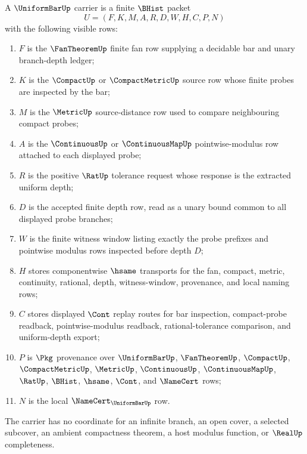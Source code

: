 \begin{definition}
\label{def:uniform-bar-carrier}
A $\UniformBarUp$ carrier is a finite $\BHist$ packet
$$
U=(F,K,M,A,R,D,W,H,C,P,N)
$$
with the following visible rows:
\begin{enumerate}
\item $F$ is the $\FanTheoremUp$ finite fan row supplying a decidable bar and unary branch-depth ledger;
\item $K$ is the $\CompactUp$ or $\CompactMetricUp$ source row whose finite probes are inspected by the bar;
\item $M$ is the $\MetricUp$ source-distance row used to compare neighbouring compact probes;
\item $A$ is the $\ContinuousUp$ or $\ContinuousMapUp$ pointwise-modulus row attached to each displayed probe;
\item $R$ is the positive $\RatUp$ tolerance request whose response is the extracted uniform depth;
\item $D$ is the accepted finite depth row, read as a unary bound common to all displayed probe branches;
\item $W$ is the finite witness window listing exactly the probe prefixes and pointwise modulus rows inspected before depth $D$;
\item $H$ stores componentwise $\hsame$ transports for the fan, compact, metric, continuity, rational, depth, witness-window, provenance, and local naming rows;
\item $C$ stores displayed $\Cont$ replay routes for bar inspection, compact-probe readback, pointwise-modulus readback, rational-tolerance comparison, and uniform-depth export;
\item $P$ is $\Pkg$ provenance over $\UniformBarUp$, $\FanTheoremUp$, $\CompactUp$, $\CompactMetricUp$, $\MetricUp$, $\ContinuousUp$, $\ContinuousMapUp$, $\RatUp$, $\BHist$, $\hsame$, $\Cont$, and $\NameCert$ rows;
\item $N$ is the local $\NameCert_{\UniformBarUp}$ row.
\end{enumerate}
The carrier has no coordinate for an infinite branch, an open cover, a selected subcover, an ambient compactness theorem, a host modulus function, or $\RealUp$ completeness.
\end{definition}


